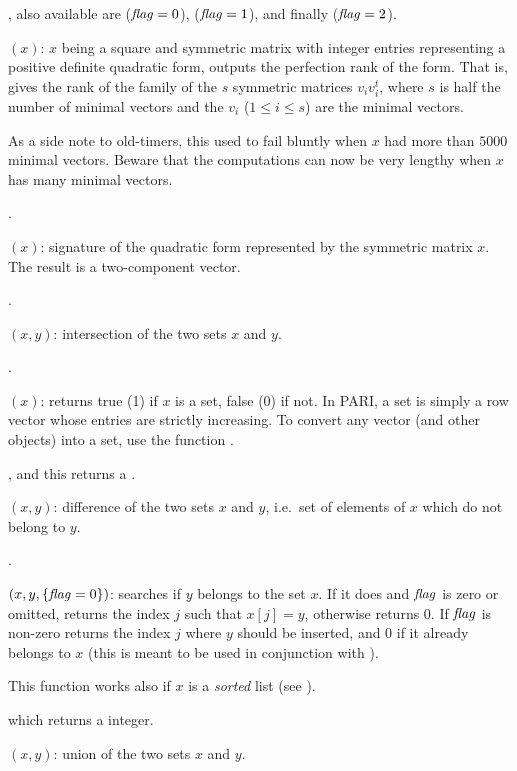 , also available are 
($\hbox{\it f\kern0pt lag\/}=0$),  ($\hbox{\it f\kern0pt lag\/}=1$), and finally
 ($\hbox{\it f\kern0pt lag\/}=2$).

$(x)$: $x$ being a square and symmetric matrix with
integer entries representing a positive definite quadratic form, outputs the
perfection rank of the form. That is, gives the rank of the family of the $s$
symmetric matrices $v_iv_i^t$, where $s$ is half the number of minimal
vectors and the $v_i$ ($1\le i\le s$) are the minimal vectors.

As a side note to old-timers, this used to fail bluntly when $x$ had more
than $5000$ minimal vectors. Beware that the computations can now be very
lengthy when $x$ has many minimal vectors.

.

$(x)$: signature of the quadratic form represented by the
symmetric matrix $x$. The result is a two-component vector.

.

$(x,y)$: intersection of the two sets $x$ and $y$.

.

$(x)$: returns true (1) if $x$ is a set, false (0) if
not. In PARI, a set is simply a row vector whose entries are strictly
increasing. To convert any vector (and other objects) into a set, use the
function .

, and this returns a .

$(x,y)$: difference of the two sets $x$ and $y$,
i.e.~set of elements of $x$ which do not belong to $y$.

.

$(x,y,\{\hbox{\it f\kern0pt lag\/}=0\})$: searches if $y$ belongs to the set
$x$. If it does and $\hbox{\it f\kern0pt lag\/}$ is zero or omitted, returns the index $j$ such that
$x[j]=y$, otherwise returns 0. If $\hbox{\it f\kern0pt lag\/}$ is non-zero returns the index $j$
where $y$ should be inserted, and $0$ if it already belongs to $x$ (this is
meant to be used in conjunction with ).

This function works also if $x$ is a \emph{sorted} list (see ).

 which returns a 
integer.

$(x,y)$: union of the two sets $x$ and $y$.

